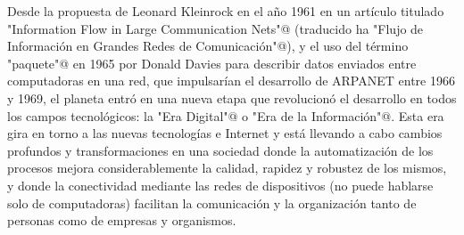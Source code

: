 \begin{introduction}
Desde la propuesta de Leonard Kleinrock en el año 1961 en un artículo titulado  \verb@"Information Flow in Large Communication Nets"@ (traducido ha
\verb@"Flujo de Información en Grandes Redes de Comunicación"@), y el uso del término
\verb@"paquete"@ en 1965 por Donald Davies para describir datos enviados entre computadoras
en una red, que impulsarían el desarrollo de ARPANET entre 1966 y 1969,  el planeta 
entró en una nueva etapa que revolucionó el desarrollo en todos los campos 
tecnológicos: la \verb@"Era Digital"@ o \verb@"Era de la Información"@. Esta era gira
en torno a las nuevas tecnologías e Internet y está llevando a cabo cambios profundos y
transformaciones en una sociedad donde la automatización de los procesos mejora
considerablemente la calidad, rapidez y robustez de los mismos, y donde la conectividad
mediante las redes de dispositivos (no puede hablarse solo de computadoras)  facilitan la comunicación y la organización tanto de personas como de empresas y organismos. 



\end{introduction}
